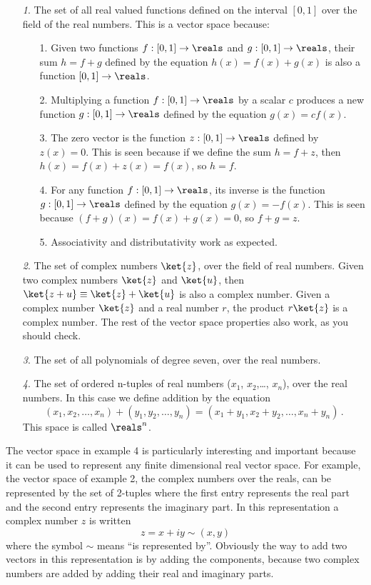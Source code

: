 \begin{enumerate}
  \item[\textit{1}.] The set of all real valued functions defined on the interval $[0, 1]$ over the field of the real numbers.
    This is a vector space because:
    \begin{enumerate}
      \item[1.] Given two functions $f: [0, 1] \to \reals$ and $g: [0, 1] \to \reals$, their sum $h = f + g$ defined by the equation $h(x) = f(x) + g(x)$ is also a function $[0, 1] \to \reals$.
      \item[2.] Multiplying a function $f: [0, 1] \to \reals$ by a scalar $c$ produces a new function $g: [0, 1] \to \reals$ defined by the equation $g(x) = c f(x)$.
      \item[3.] The zero vector is the function $z:[0, 1] \to \reals$ defined by $z(x) = 0$. This is seen because if we define the sum $h = f + z$, then $h(x) = f(x) + z(x) = f(x)$, so $h = f$.
      \item[4.] For any function $f:[0, 1] \to \reals$, its inverse is the function $g:[0, 1] \to \reals$ defined by the equation $g(x) = -f(x)$. This is seen because $(f + g)(x) = f(x) + g(x) = 0$, so $f + g = z$.
      \item[5.] Associativity and distributativity work as expected.
    \end{enumerate}
  \item[\textit{2}.] The set of complex numbers $\ket{z}$, over the field of real numbers.
    Given two complex numbers $\ket{z}$ and $\ket{u}$, then $\ket{z+u} \equiv \ket{z} + \ket{u}$ is also a complex number.
    Given a complex number $\ket{z}$ and a real number $r$, the product $r\ket{z}$ is a complex number.
    The rest of the vector space properties also work, as you should check.
  \item[\textit{3}.] The set of all polynomials of degree seven, over the real numbers.
  \item[\textit{4}.] The set of ordered n-tuples of real numbers ($x_1$, $x_2$,\ldots , $x_n$), over the real numbers.
    In this case we define addition by the equation
    \begin{equation*}
      (x_1, x_2, \ldots, x_n) + (y_1, y_2, \ldots, y_n) = (x_1 + y_1, x_2 + y_2, \ldots, x_n + y_n) \, .
    \end{equation*}
    This space is called $\reals^n$.
\end{enumerate}
The vector space in example 4 is particularly interesting and important because it can be used to represent any finite dimensional real vector space.
For example, the vector space of example 2, the complex numbers over the reals, can be represented by the set of 2-tuples where the first entry represents the real part and the second entry represents the imaginary part.
In this representation a complex number $z$ is written
\begin{equation*}
  z = x + iy \sim (x,y)
\end{equation*}
where the symbol $\sim$ means ``is represented by''.
Obviously the way to add two vectors in this representation is by adding the components, because two complex numbers are added by adding their real and imaginary parts.


